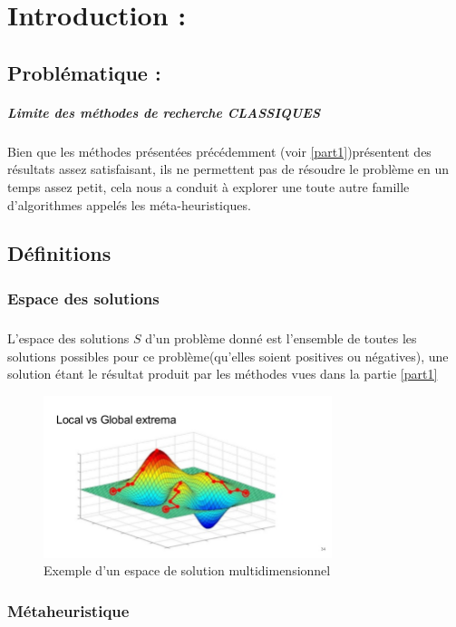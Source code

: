 
\chapter{Introduction : }
	\section{Problématique : }
	\paragraph{Limite des méthodes de recherche CLASSIQUES}
	Bien que les méthodes présentées précédemment (voir \ref{part1})présentent des résultats assez satisfaisant, ils ne permettent pas de résoudre le problème en un temps assez petit, cela nous a conduit à explorer une toute autre famille d'algorithmes appelés les méta-heuristiques.
	\section{Définitions}
	
		\subsection{Espace des solutions}
		\paragraph{}
		L'espace des solutions $S$ d'un problème donné est l'ensemble de toutes les solutions possibles pour ce problème(qu'elles soient positives ou négatives), une solution étant le résultat produit par les méthodes vues dans la partie \ref{part1}
		\begin{figure}[H]
			\centering
			\includegraphics[width=0.75\textwidth]{images/solutionSpace.jpg}
			\caption{Exemple d'un espace de solution multidimensionnel}
		\end{figure}
		\subsection{Métaheuristique}
